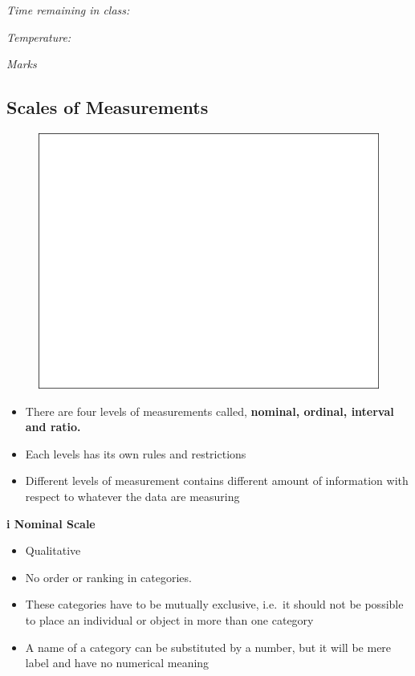 \documentclass[]{book}
\providecommand{\tightlist}{%
  \setlength{\itemsep}{0pt}\setlength{\parskip}{0pt}}
\begin{document}
\emph{Time remaining in class:}

\emph{Temperature:}

\emph{Marks}

\hypertarget{scales-of-measurements}{%
\subsection{Scales of Measurements}\label{scales-of-measurements}}

\begin{figure}

{\centering \includegraphics[width=1\linewidth]{figure/box3-1} 

}

\end{figure}

\begin{itemize}
\tightlist
\item
  There are four levels of measurements called, \textbf{nominal, ordinal, interval and ratio.}
\item
  Each levels has its own rules and restrictions
\item
  Different levels of measurement contains different amount of information with respect to whatever the data are measuring
\end{itemize}

\textbf{i Nominal Scale}

\begin{itemize}
\tightlist
\item
  Qualitative
\item
  No order or ranking in categories.
\item
  These categories have to be mutually exclusive, i.e.~it should not be possible to place an individual or object in more than one category
\item
  A name of a category can be substituted by a number, but it will be mere label and have no numerical meaning
\end{itemize}
\end{document}
